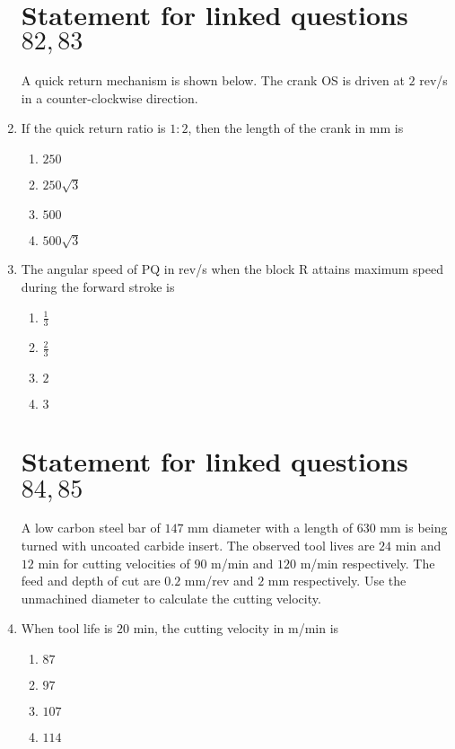 \documentclass[journal,12pt,twocolumn]{IEEEtran}
\theoremstyle{remark}
\begin{document}
\begin{enumerate}[start=69]
                        \section{Statement for linked questions$82 , 83$}
                          A quick return mechanism is shown below. The crank OS is driven at $2$ rev/s in a counter-clockwise direction.
                        
                         \item If the quick return ratio is $1:2$, then the length of the crank in mm is
                            \begin{enumerate}
                               \item  $250$
                               \item  $250 \sqrt{3}$
                                \item $500$
                                \item $500 \sqrt{3}$
                            \end{enumerate}
                           \item The angular speed of PQ in rev/s when the block R attains maximum speed during the forward stroke  is
                            \begin{enumerate}
                               \item  $\frac{1}{3}$
                               \item  $\frac{2}{3}$
                               \item  $2$
                               \item  $3$
                            \end{enumerate}
                            \section{Statement for linked questions$84 , 85$}
                         A low carbon steel bar of $147$ mm diameter with a length of $630$ mm is being turned with uncoated carbide insert. The observed tool lives are $24$ min and $12$ min for cutting velocities of $90$ m/min and $120$ m/min respectively. The feed and depth of cut are $0.2$ mm/rev and $2$ mm respectively. Use the unmachined diameter to calculate the cutting velocity.
                         \item When tool life is $20$ min, the cutting velocity in m/min is
                            \begin{enumerate}
                               \item  $87$ 
                               \item  $97$ 
                                \item $107$ 
                                \item $114$
                            \end{enumerate}
                        

\end{enumerate}
\end{document}
